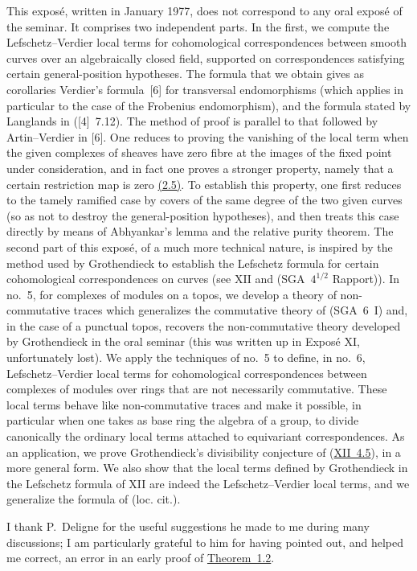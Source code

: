 \documentclass[11pt]{article}
\begin{document}
This exposé, written in January 1977, does not correspond to any oral exposé of the seminar. It comprises two independent parts. In the first, we compute the Lefschetz--Verdier local terms for cohomological correspondences between smooth curves over an algebraically closed field, supported on correspondences satisfying certain general-position hypotheses. The formula that we obtain gives as corollaries Verdier's formula~[6] for transversal endomorphisms (which applies in particular to the case of the Frobenius endomorphism), and the formula stated by Langlands in ([4]~7.12). The method of proof is parallel to that followed by Artin--Verdier in [6]. One reduces to proving the vanishing of the local term when the given complexes of sheaves have zero fibre at the images of the fixed point under consideration, and in fact one proves a stronger property, namely that a certain restriction map is zero \hyperref[sga5:IIIB:proposition:2.5]{(2.5)}. To establish this property, one first reduces to the tamely ramified case by covers of the same degree of the two given curves (so as not to destroy the general-position hypotheses), and then treats this case directly by means of Abhyankar's lemma and the relative purity theorem. The second part of this exposé, of a much more technical nature, is inspired by the method used by Grothendieck to establish the Lefschetz formula for certain cohomological correspondences on curves (see XII and (SGA~$4^{1/2}$ Rapport)). In no.~5, for complexes of modules on a topos, we develop a theory of non-commutative traces which generalizes the commutative theory of (SGA~6~I) and, in the case of a punctual topos, recovers the non-commutative theory developed by Grothendieck in the oral seminar (this was written up in Exposé XI, unfortunately lost). We apply the techniques of no.~5 to define, in no.~6, Lefschetz--Verdier local terms for cohomological correspondences between complexes of modules over rings that are not necessarily commutative. These local terms behave like non-commutative traces and make it possible, in particular when one takes as base ring the algebra of a group, to divide canonically the ordinary local terms attached to equivariant correspondences. As an application, we prove Grothendieck's divisibility conjecture of (\hyperref[sga5:XII:conjecture:4.5]{XII~4.5}), in a more general form. We also show that the local terms defined by Grothendieck in the Lefschetz formula of XII are indeed the Lefschetz--Verdier local terms, and we generalize the formula of (loc. cit.).

I thank P.~Deligne for the useful suggestions he made to me during many discussions; I am particularly grateful to him for having pointed out, and helped me correct, an error in an early proof of \hyperref[sga5:IIIB:theorem:1.2]{Theorem~1.2}.
\end{document}
